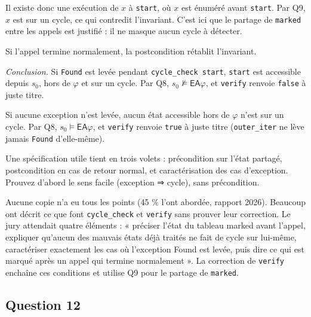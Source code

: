\documentclass[11pt,a4paper]{article}
\newcommand{\equationajustee}[1]{%
  \sbox{\boiteequation}{$\displaystyle #1$}%
  \ifdim\wd\boiteequation>\linewidth
    \[\resizebox{\linewidth}{!}{\usebox{\boiteequation}}\]%
  \else
    \[#1\]%
  \fi}
\begin{document}
Il existe donc une exécution de \(x\) à \texttt{start}, où \(x\) est énuméré avant \texttt{start}. Par Q9, \(x\) est sur un cycle, ce qui contredit l'invariant. C'est ici que le partage de \texttt{marked} entre les appels est justifié : il ne masque aucun cycle à détecter.

Si l'appel termine normalement, la postcondition rétablit l'invariant.

\emph{Conclusion.} Si \texttt{Found} est levée pendant \texttt{cycle\_check\ start}, \texttt{start} est accessible depuis \(s_0\), hors de \(\varphi\) et sur un cycle. Par Q8, \(s_0\not\models\mathsf{EA}\varphi\), et \texttt{verify} renvoie \texttt{false} à juste titre.

Si aucune exception n'est levée, aucun état accessible hors de \(\varphi\) n'est sur un cycle. Par Q8, \(s_0\models\mathsf{EA}\varphi\), et \texttt{verify} renvoie \texttt{true} à juste titre (\texttt{outer\_iter} ne lève jamais \texttt{Found} d'elle-même).

\equationajustee{\boxed{\texttt{verify t phi s0} = \texttt{true} \iff s_0\models\mathsf{EA}\,\varphi}}

\begin{methode}

Une spécification utile tient en trois volets : précondition sur l'état partagé, postcondition en cas de retour normal, et caractérisation des cas d'exception. Prouvez d'abord le sens facile (exception ⇒ cycle), sans précondition.

\end{methode}

\begin{jury}

Aucune copie n'a eu tous les points (45 \% l'ont abordée, rapport 2026). Beaucoup ont décrit ce que font \texttt{cycle\_check} et \texttt{verify} sans prouver leur correction. Le jury attendait quatre éléments : « préciser l'état du tableau marked avant l'appel, expliquer qu'aucun des mauvais états déjà traités ne fait de cycle sur lui-même, caractériser exactement les cas où l'exception Found est levée, puis dire ce qui est marqué après un appel qui termine normalement ». La correction de \texttt{verify} enchaîne ces conditions et utilise Q9 pour le partage de \texttt{marked}.

\end{jury}

\hypertarget{question-12}{%
\subsection{Question 12}\label{question-12}}
\end{document}
